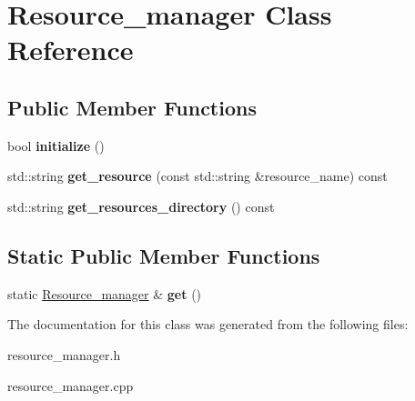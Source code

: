 \hypertarget{class_resource__manager}{
\section{Resource\_\-manager Class Reference}
\label{class_resource__manager}
}
\subsection*{Public Member Functions}
\begin{DoxyCompactItemize}
\item 
\hypertarget{class_resource__manager_ad87cf89cfffe7fdaf738a3c14747c234}{
bool {\bfseries initialize} ()}
\label{class_resource__manager_ad87cf89cfffe7fdaf738a3c14747c234}

\item 
\hypertarget{class_resource__manager_acf94ec6981308b0c3574d8960f61b264}{
std::string {\bfseries get\_\-resource} (const std::string \&resource\_\-name) const }
\label{class_resource__manager_acf94ec6981308b0c3574d8960f61b264}

\item 
\hypertarget{class_resource__manager_ad1ef4db85df356e6ee46bd6bb603a85d}{
std::string {\bfseries get\_\-resources\_\-directory} () const }
\label{class_resource__manager_ad1ef4db85df356e6ee46bd6bb603a85d}

\end{DoxyCompactItemize}
\subsection*{Static Public Member Functions}
\begin{DoxyCompactItemize}
\item 
\hypertarget{class_resource__manager_a042e0c1c846ded4c61a5f5f923932a3a}{
static \hyperlink{class_resource__manager}{Resource\_\-manager} \& {\bfseries get} ()}
\label{class_resource__manager_a042e0c1c846ded4c61a5f5f923932a3a}

\end{DoxyCompactItemize}


The documentation for this class was generated from the following files:\begin{DoxyCompactItemize}
\item 
resource\_\-manager.h\item 
resource\_\-manager.cpp\end{DoxyCompactItemize}
